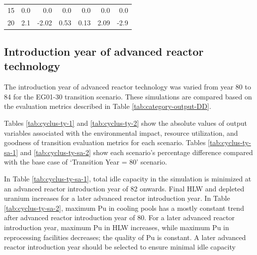 \begin{table}[H]
\begin{tabularx}{\textwidth}{R|RRRRRR}
        15 & 0.0              & 0.0                            & 0.0           & 0.0                         & 0.0               & 0.0                             \\
        20 & 2.1              & -2.02                          & 0.53          & 0.13                        & 2.09              & -2.9                           \\ \hline
                           \end{tabularx}%
    
    \end{table}


\subsection{Introduction year of advanced reactor technology}
The introduction year of advanced reactor technology
was varied from year 80 to 84 for the \Cyclus 
EG01-30 transition scenario. 
These simulations are compared based on the evaluation 
metrics described in Table \ref{tab:category-output-DD}.

Tables \ref{tab:cyclus-ty-1} and \ref{tab:cyclus-ty-2} show 
the absolute values of 
output variables associated with the environmental impact, 
resource utilization, and goodness of transition evaluation 
metrics for each scenario. 
Tables \ref{tab:cyclus-ty-sa-1} and \ref{tab:cyclus-ty-sa-2} 
show each scenario's percentage 
difference compared with the base case of `Transition Year = 80'
scenario. 

In Table \ref{tab:cyclus-ty-sa-1}, total idle capacity 
in the simulation is minimized at an advanced reactor 
introduction year of 82 onwards. 
Final HLW and depleted uranium increases for a later 
advanced reactor introduction year.
In Table \ref{tab:cyclus-ty-sa-2}, maximum Pu in cooling 
pools has a mostly constant trend after advanced reactor 
introduction year of 80. 
For a later advanced reactor introduction year, 
maximum Pu in HLW increases, while maximum Pu in reprocessing facilities 
decreases; the quality of Pu is constant. 
A later advanced reactor introduction year should be 
selected to ensure minimal idle capacity

